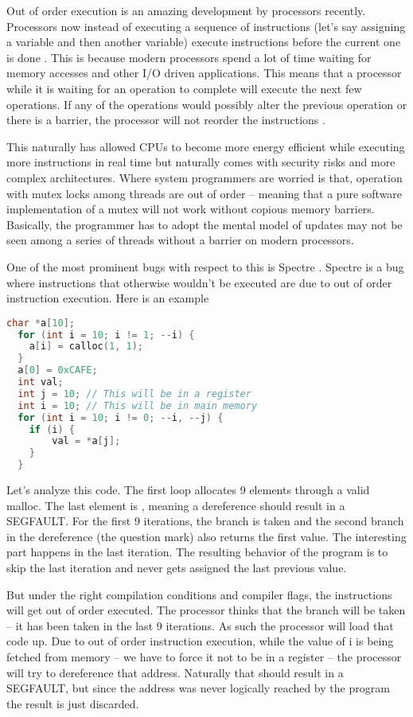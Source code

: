 Out of order execution is an amazing development by processors recently.
Processors now instead of executing a sequence of instructions (let's say assigning a variable and then another variable) execute instructions before the current one is done \cite[P. 45]{guide2011intel}.
This is because modern processors spend a lot of time waiting for memory accesses and other I/O driven applications.
This means that a processor while it is waiting for an operation to complete will execute the next few operations.
If any of the operations would possibly alter the previous operation or there is a barrier, the processor will not reorder the instructions \cite[P. 296]{guide2011intel}.

This naturally has allowed CPUs to become more energy efficient while executing more instructions in real time but naturally comes with security risks and more complex architectures.
Where system programmers are worried is that, operation with mutex locks among threads are out of order -- meaning that a pure software implementation of a mutex will not work without copious memory barriers.
Basically, the programmer has to adopt the mental model of updates may not be seen among a series of threads without a barrier on modern processors.

One of the most prominent bugs with respect to this is Spectre \cite{kocher2018spectre}.
Spectre is a bug where instructions that otherwise wouldn't be executed are due to out of order instruction execution.
Here is an example
\begin{lstlisting}[language=C]
  char *a[10];
  for (int i = 10; i != 1; --i) {
    a[i] = calloc(1, 1);
  }
  a[0] = 0xCAFE;
  int val;
  int j = 10; // This will be in a register
  int i = 10; // This will be in main memory
  for (int i = 10; i != 0; --i, --j) {
    if (i) {
        val = *a[j];
    }
  }
\end{lstlisting}

Let's analyze this code.
The first loop allocates 9 elements through a valid malloc.
The last element is , meaning a dereference should result in a SEGFAULT.
For the first 9 iterations, the branch is taken and the second branch in the dereference (the question mark) also returns the first value.
The interesting part happens in the last iteration.
The resulting behavior of the program is to skip the last iteration and  never gets assigned the last previous value.

But under the right compilation conditions and compiler flags, the instructions will get out of order executed. The processor thinks that the branch will be taken -- it has been taken in the last 9 iterations.
As such the processor will load that code up.
Due to out of order instruction execution, while the value of i is being fetched from memory -- we have to force it not to be in a register -- the processor will try to dereference that address.
Naturally that should result in a SEGFAULT, but since the address was never logically reached by the program the result is just discarded.

